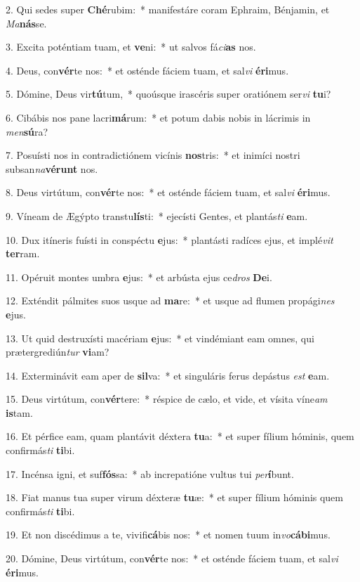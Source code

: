 2. Qui sedes super \textbf{Ché}rubim:~*  manifestáre coram Ephraim, Bénjamin, et \textit{Ma}\textbf{nás}se.\

3. Excita poténtiam tuam, et \textbf{ve}ni:~*  ut salvos fá\textit{ci}\textbf{as} nos.\

4. Deus, con\textbf{vér}te nos:~*  et osténde fáciem tuam, et sal\textit{vi} \textbf{é}\textbf{ri}mus.\

5. Dómine, Deus vir\textbf{tú}tum,~*  quoúsque irascéris super oratiónem ser\textit{vi} \textbf{tu}i?\

6. Cibábis nos pane lacri\textbf{má}rum:~*  et potum dabis nobis in lácrimis in \textit{men}\textbf{sú}ra?\

7. Posuísti nos in contradictiónem vicínis \textbf{nos}tris:~*  et inimíci nostri subsan\textit{na}\textbf{vé}\textbf{runt} nos.\

8. Deus virtútum, con\textbf{vér}te nos:~*  et osténde fáciem tuam, et sal\textit{vi} \textbf{é}\textbf{ri}mus.\

9. Víneam de Ægýpto transtu\textbf{lís}ti:~*  ejecísti Gentes, et plantás\textit{ti} \textbf{e}am.\

10. Dux itíneris fuísti in conspéctu \textbf{e}jus:~*  plantásti radíces ejus, et implé\textit{vit} \textbf{ter}ram.\

11. Opéruit montes umbra \textbf{e}jus:~*  et arbústa ejus ce\textit{dros} \textbf{De}i.\

12. Exténdit pálmites suos usque ad \textbf{ma}re:~*  et usque ad flumen propági\textit{nes} \textbf{e}jus.\

13. Ut quid destruxísti macériam \textbf{e}jus:~*  et vindémiant eam omnes, qui prætergrediún\textit{tur} \textbf{vi}am?\

14. Exterminávit eam aper de \textbf{sil}va:~*  et singuláris ferus depástus \textit{est} \textbf{e}am.\

15. Deus virtútum, con\textbf{vér}tere:~*  réspice de cælo, et vide, et vísita víne\textit{am} \textbf{is}tam.\

16. Et pérfice eam, quam plantávit déxtera \textbf{tu}a:~*  et super fílium hóminis, quem confirmás\textit{ti} \textbf{ti}bi.\

17. Incénsa igni, et suf\textbf{fós}sa:~*  ab increpatióne vultus tui \textit{per}\textbf{í}bunt.\

18. Fiat manus tua super virum déxteræ \textbf{tu}æ:~*  et super fílium hóminis quem confirmás\textit{ti} \textbf{ti}bi.\

19. Et non discédimus a te, vivifi\textbf{cá}bis nos:~*  et nomen tuum in\textit{vo}\textbf{cá}\textbf{bi}mus.\

20. Dómine, Deus virtútum, con\textbf{vér}te nos:~*  et osténde fáciem tuam, et sal\textit{vi} \textbf{é}\textbf{ri}mus.\

